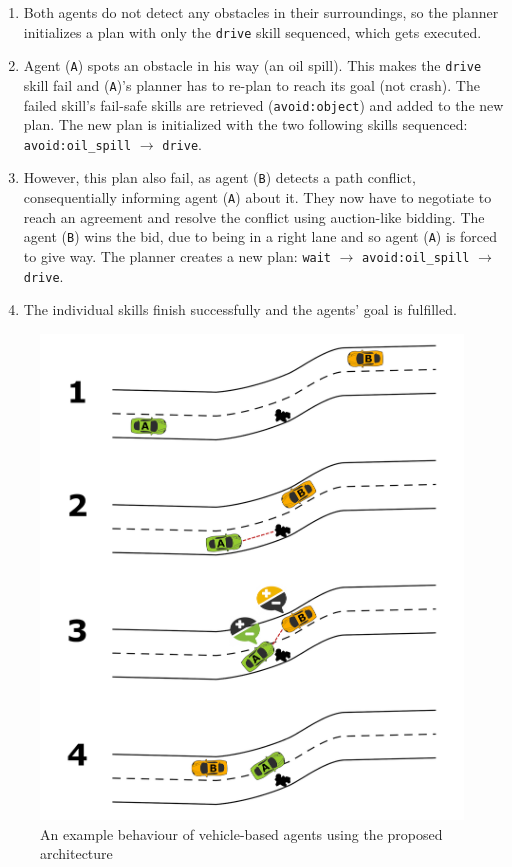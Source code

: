 \documentclass[main.tex]{subfiles}
\begin{document}
\begin{enumerate}
    \item Both agents do not detect any obstacles in their surroundings, so the planner
    initializes a plan with only the \texttt{drive} skill sequenced, which gets executed. 

    \item Agent (\texttt{A}) spots an obstacle in his way (an oil spill). This makes the
    \texttt{drive} skill fail and (\texttt{A})'s planner has to re-plan to reach its goal (not
    crash). The failed skill's fail-safe skills are retrieved (\texttt{avoid:object})
    and added to the new plan. The new plan is initialized with the two
    following skills sequenced: \texttt{avoid:oil\_spill} $\rightarrow$ \texttt{drive}.
    
    \item However, this plan also fail, as agent (\texttt{B}) detects a path conflict, consequentially 
    informing agent (\texttt{A}) about it. They now have to negotiate to reach an agreement and
    resolve the conflict using auction-like bidding. The agent (\texttt{B}) wins the bid, due
    to being in a right lane and so agent (\texttt{A}) is forced to give way. The planner
    creates a new plan: \texttt{wait} $\rightarrow$ \texttt{avoid:oil\_spill} $\rightarrow$
    \texttt{drive}.
    
    \item The individual skills finish successfully and the agents' goal is fulfilled.
\end{enumerate}

\begin{figure}[htbp]
    \centering
    \includegraphics[width=.8\textwidth]{AgentPlanning.png}
    \caption{An example behaviour of vehicle-based agents using the proposed architecture}
    \label{agentReplanning}
\end{figure}
\end{document}
